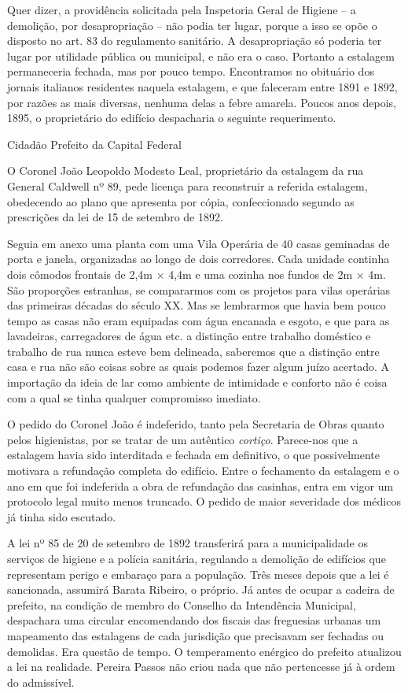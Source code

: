 Quer dizer, a providência solicitada pela Inspetoria Geral de Higiene --
a demolição, por desapropriação -- não podia ter lugar, porque a isso se
opõe o disposto no art. 83 do regulamento sanitário. A desapropriação só
poderia ter lugar por utilidade pública ou municipal, e não era o caso.
Portanto a estalagem permaneceria fechada, mas por pouco tempo.
Encontramos no obituário dos jornais italianos residentes naquela
estalagem, e que faleceram entre 1891 e 1892, por razões as mais
diversas, nenhuma delas a febre amarela. Poucos anos depois, 1895, o
proprietário do edifício despacharia o seguinte requerimento.

Cidadão Prefeito da Capital Federal

O Coronel João Leopoldo Modesto Leal, proprietário da estalagem da rua
General Caldwell nº 89, pede licença para reconstruir a referida
estalagem, obedecendo ao plano que apresenta por cópia, confeccionado
segundo as prescrições da lei de 15 de setembro de 1892.

Seguia em anexo uma planta com uma Vila Operária de 40 casas geminadas
de porta e janela, organizadas ao longo de dois corredores. Cada unidade
continha dois cômodos frontais de 2,4m × 4,4m e uma cozinha nos fundos
de 2m × 4m. São proporções estranhas, se compararmos com os projetos
para vilas operárias das primeiras décadas do século XX. Mas se
lembrarmos que havia bem pouco tempo as casas não eram equipadas com
água encanada e esgoto, e que para as lavadeiras, carregadores de água
etc. a distinção entre trabalho doméstico e trabalho de rua nunca esteve
bem delineada, saberemos que a distinção entre casa e rua não são coisas
sobre as quais podemos fazer algum juízo acertado. A importação da ideia
de lar como ambiente de intimidade e conforto não é coisa com a qual se
tinha qualquer compromisso imediato.

O pedido do Coronel João é indeferido, tanto pela Secretaria de Obras
quanto pelos higienistas, por se tratar de um autêntico \emph{cortiço}.
Parece-nos que a estalagem havia sido interditada e fechada em
definitivo, o que possivelmente motivara a refundação completa do
edifício. Entre o fechamento da estalagem e o ano em que foi indeferida
a obra de refundação das casinhas, entra em vigor um protocolo legal
muito menos truncado. O pedido de maior severidade dos médicos já tinha
sido escutado.

A lei nº 85 de 20 de setembro de 1892 transferirá para a municipalidade
os serviços de higiene e a polícia sanitária, regulando a demolição de
edifícios que representam perigo e embaraço para a população. Três meses
depois que a lei é sancionada, assumirá Barata Ribeiro, o próprio. Já
antes de ocupar a cadeira de prefeito, na condição de membro do Conselho
da Intendência Municipal, despachara uma circular encomendando dos
fiscais das freguesias urbanas um mapeamento das estalagens de cada
jurisdição que precisavam ser fechadas ou demolidas. Era questão de
tempo. O temperamento enérgico do prefeito atualizou a lei na realidade.
Pereira Passos não criou nada que não pertencesse já à ordem do
admissível.

